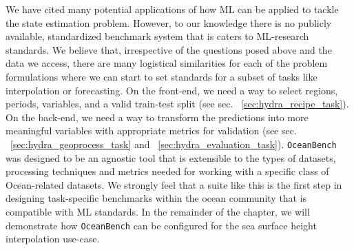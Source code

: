 We have cited many potential applications of how ML can be applied to tackle the state estimation problem. 
However, to our knowledge there is no publicly available, standardized benchmark system that is caters to ML-research standards.
We believe that, irrespective of the questions posed above and the data we access, there are many logistical similarities for each of the problem formulations where we can start to set standards for a subset of tasks like interpolation or forecasting. 
On the front-end, we need a way to select regions, periods, variables, and a valid train-test split (see sec. ~\ref{sec:hydra_recipe_task}). 
On the back-end, we need a way to transform the predictions into more meaningful variables with appropriate metrics for validation (see sec. ~\ref{sec:hydra_geoprocess_task} and ~\ref{sec:hydra_evaluation_task}).
\texttt{OceanBench} was designed to be an agnostic tool that is extensible to the types of datasets, processing techniques and metrics needed for working with a specific class of Ocean-related datasets. 
We strongly feel that a suite like this is the first step in designing task-specific benchmarks within the ocean community that is compatible with ML standards. 
In the remainder of the chapter, we will demonstrate how \texttt{OceanBench} can be configured for the sea surface height interpolation use-case.
